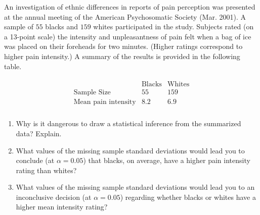 
\begin{exercise}

An investigation of ethnic differences in reports of pain perception was presented at the annual meeting of the American Psychosomatic Society (Mar. 2001).
A sample of $55$ blacks and $159$ whites participated in the study.
Subjects rated (on a 13-point scale) the intensity and unpleasantness of pain felt when a bag of ice was placed on their foreheads for two minutes.
(Higher ratings correspond to higher pain intensity.)
A summary of the results is provided in the following table.

\begin{align*}
    \begin{array}{l|cc}
                                   & \text{Blacks} & \text{Whites} \\ \hline
        \text{Sample Size}         & 55            & 159           \\
        \text{Mean pain intensity} & 8.2           & 6.9           \\
    \end{array}
\end{align*}

\begin{enumerate}[label = (\alph*)]

    \item Why is it dangerous to draw a statistical inference from the summarized data?
    Explain.

    \item What values of the missing sample standard deviations would lead you to conclude (at $\alpha = 0.05$) that blacks, on average, have a higher pain intensity rating than whites?

    \item What values of the missing sample standard deviations would lead you to an inconclusive decision (at $\alpha = 0.05$) regarding whether blacks or whites have a higher mean intensity rating?

\end{enumerate}

\end{exercise}


